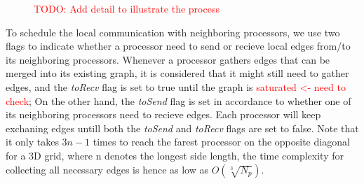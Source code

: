 \documentclass[10pt, conference, compsocconf]{IEEEtran}
\begin{document}
\begin{figure}[ht]
  \centering
  \caption[Optional caption for list of figures]{\textcolor{red}{TODO: Add detail to illustrate the process}}
\end{figure}

To schedule the local communication with neighboring processors, we use two flags to indicate whether a processor need to send or recieve local edges from/to its neighboring processors. Whenever a processor gathers edges that can be merged into its existing graph, it is considered that it might still need to gather edges, and the \emph{toRecv} flag is set to true until the graph is \textcolor{red}{saturated <- need to check}; On the other hand, the \emph{toSend} flag is set in accordance to whether one of its neighboring processors need to recieve edges. Each processor will keep exchaning edges untill both the \emph{toSend} and \emph{toRecv} flags are set to false. Note that it only takes ${3n-1}$ times to reach the farest processor on the opposite diagonal for a 3D grid, where n denotes the longest side length, the time complexity for collecting all necessary edges is hence as low as ${O(\sqrt[3]{N_p})}$.
\end{document}

